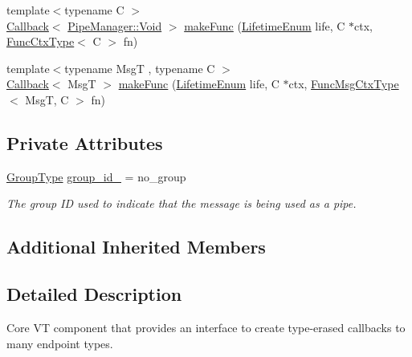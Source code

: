 \begin{DoxyCompactItemize}
\item 
{\footnotesize template$<$typename C $>$ }\\\hyperlink{namespacevt_a36db99df4c973d48b1118a293fff533f}{Callback}$<$ \hyperlink{structvt_1_1pipe_1_1_pipe_manager_ab720c2580ecfd3ab36e49aeaaff64cc6}{Pipe\+Manager\+::\+Void} $>$ \hyperlink{structvt_1_1pipe_1_1_pipe_manager_a51d552105b29056f146fecab880eb6c4}{make\+Func} (\hyperlink{namespacevt_1_1pipe_acb42b284378c0fdac1d7c6335dc26f58}{Lifetime\+Enum} life, C $\ast$ctx, \hyperlink{structvt_1_1pipe_1_1_pipe_manager_base_ad8463823b6b4cfdb67c119d6d22e3bac}{Func\+Ctx\+Type}$<$ C $>$ fn)
\item 
{\footnotesize template$<$typename MsgT , typename C $>$ }\\\hyperlink{namespacevt_a36db99df4c973d48b1118a293fff533f}{Callback}$<$ MsgT $>$ \hyperlink{structvt_1_1pipe_1_1_pipe_manager_aeade0c95a974823a05ba925167c82889}{make\+Func} (\hyperlink{namespacevt_1_1pipe_acb42b284378c0fdac1d7c6335dc26f58}{Lifetime\+Enum} life, C $\ast$ctx, \hyperlink{structvt_1_1pipe_1_1_pipe_manager_base_a73fdf82ece0411b3dc644c99b763f7a9}{Func\+Msg\+Ctx\+Type}$<$ MsgT, C $>$ fn)
\end{DoxyCompactItemize}
\subsection*{Private Attributes}
\begin{DoxyCompactItemize}
\item 
\hyperlink{namespacevt_a27b5e4411c9b6140c49100e050e2f743}{Group\+Type} \hyperlink{structvt_1_1pipe_1_1_pipe_manager_a55c4e1e68f74a2a0796a24ea06711563}{group\+\_\+id\+\_\+} = no\+\_\+group
\begin{DoxyCompactList}\small\item\em The group ID used to indicate that the message is being used as a pipe. \end{DoxyCompactList}\end{DoxyCompactItemize}
\subsection*{Additional Inherited Members}


\subsection{Detailed Description}
Core VT component that provides an interface to create type-\/erased callbacks to many endpoint types. 

